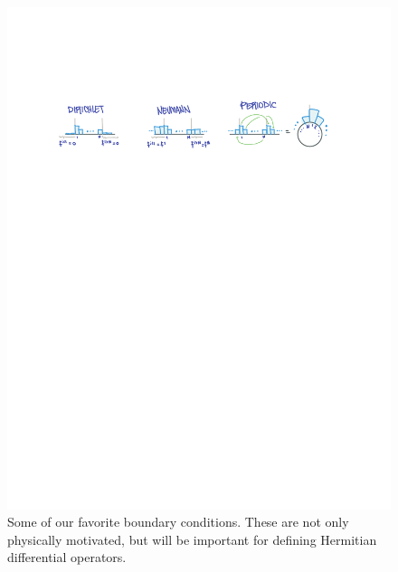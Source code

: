 \begin{figure}[tb]
    \centering
    \includegraphics[width=.95\textwidth]{figures/BoundaryConditions.pdf}
    \caption{Some of our favorite boundary conditions. These are not only physically motivated, but will be important for defining Hermitian differential operators.}
    \label{fig:boundary:conditions}
\end{figure}



